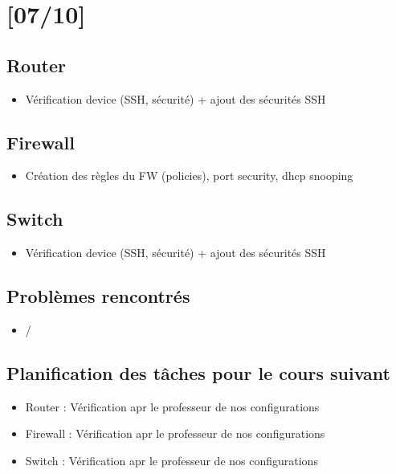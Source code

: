 \documentclass{article}
\begin{document}
\newpage
\section{[07/10]}

\subsection{Router}

\begin{itemize}

\item Vérification device (SSH, sécurité) + ajout des sécurités SSH
\end{itemize} 

\subsection{Firewall}

\begin{itemize}

\item Création des règles du FW (policies), port security, dhcp snooping

\end{itemize} 
\subsection{Switch}

\begin{itemize}

\item Vérification device (SSH, sécurité) + ajout des sécurités SSH
\end{itemize} 
\subsection{Problèmes rencontrés}
\begin{itemize}

\item /
\end{itemize} 
\subsection{Planification des tâches pour le cours suivant}
\begin{itemize}

\item Router : Vérification apr le professeur de nos configurations
\item Firewall : Vérification apr le professeur de nos configurations
\item Switch : Vérification apr le professeur de nos configurations


\end{itemize} 
\end{document}
